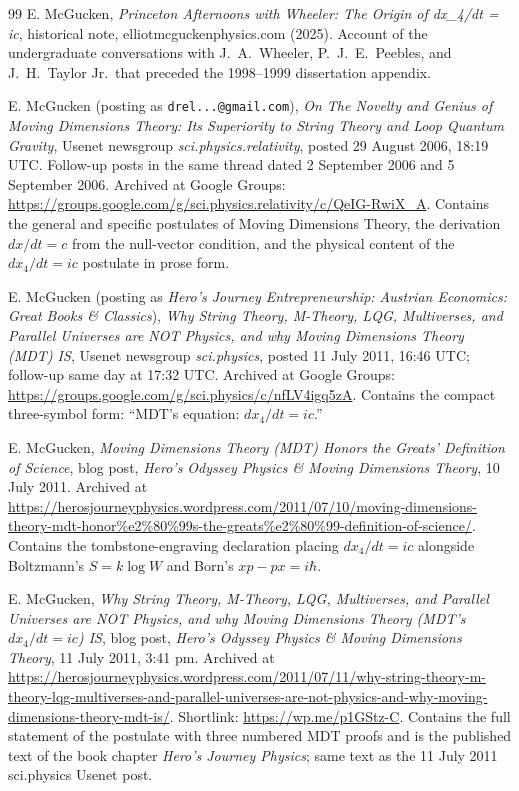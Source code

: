 \documentclass[11pt,a4paper]{article}
\begin{document}
\begin{thebibliography}{99}
 E. McGucken, \emph{Princeton Afternoons with Wheeler: The Origin of dx\_4/dt = ic}, historical note, elliotmcguckenphysics.com (2025). Account of the undergraduate conversations with J.\ A.\ Wheeler, P.\ J.\ E.\ Peebles, and J.\ H.\ Taylor Jr.\ that preceded the 1998--1999 dissertation appendix.

 E. McGucken (posting as \texttt{drel...@gmail.com}), \emph{On The Novelty and Genius of Moving Dimensions Theory: Its Superiority to String Theory and Loop Quantum Gravity}, Usenet newsgroup \emph{sci.physics.relativity}, posted 29 August 2006, 18:19 UTC. Follow-up posts in the same thread dated 2 September 2006 and 5 September 2006. Archived at Google Groups: \url{https://groups.google.com/g/sci.physics.relativity/c/QeIG-RwiX_A}. Contains the general and specific postulates of Moving Dimensions Theory, the derivation $dx/dt = c$ from the null-vector condition, and the physical content of the $dx_4/dt = ic$ postulate in prose form.

 E. McGucken (posting as \emph{Hero's Journey Entrepreneurship: Austrian Economics: Great Books \& Classics}), \emph{Why String Theory, M-Theory, LQG, Multiverses, and Parallel Universes are NOT Physics, and why Moving Dimensions Theory (MDT) IS}, Usenet newsgroup \emph{sci.physics}, posted 11 July 2011, 16:46 UTC; follow-up same day at 17:32 UTC. Archived at Google Groups: \url{https://groups.google.com/g/sci.physics/c/nfLV4igq5zA}. Contains the compact three-symbol form: ``MDT's equation: $dx_4/dt = ic$.''

 E. McGucken, \emph{Moving Dimensions Theory (MDT) Honors the Greats' Definition of Science}, blog post, \emph{Hero's Odyssey Physics \& Moving Dimensions Theory}, 10 July 2011. Archived at \url{https://herosjourneyphysics.wordpress.com/2011/07/10/moving-dimensions-theory-mdt-honor\%e2\%80\%99s-the-greats\%e2\%80\%99-definition-of-science/}. Contains the tombstone-engraving declaration placing $dx_4/dt = ic$ alongside Boltzmann's $S = k\log W$ and Born's $xp - px = i\hbar$.

 E. McGucken, \emph{Why String Theory, M-Theory, LQG, Multiverses, and Parallel Universes are NOT Physics, and why Moving Dimensions Theory (MDT's $dx_4/dt=ic$) IS}, blog post, \emph{Hero's Odyssey Physics \& Moving Dimensions Theory}, 11 July 2011, 3:41 pm. Archived at \url{https://herosjourneyphysics.wordpress.com/2011/07/11/why-string-theory-m-theory-lqg-multiverses-and-parallel-universes-are-not-physics-and-why-moving-dimensions-theory-mdt-is/}. Shortlink: \url{https://wp.me/p1GStz-C}. Contains the full statement of the postulate with three numbered MDT proofs and is the published text of the book chapter \emph{Hero's Journey Physics}; same text as the 11 July 2011 sci.physics Usenet post.


\end{thebibliography}
\end{document}
